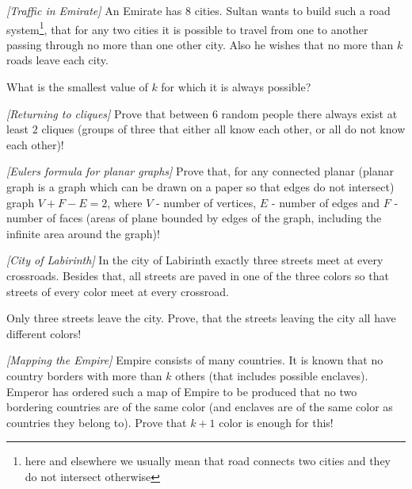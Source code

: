 

%



\noindent 


\begin{problem}
\textit{[Traffic in Emirate]}
An Emirate has 8 cities. Sultan wants to build such a road system\footnote{here and elsewhere we usually mean that road connects two cities and they do not intersect otherwise}, that for any two cities it is possible to travel from one to another passing through no more than one other city. Also he wishes that no more than $k$ roads leave each city.

 What is the smallest value of $k$ for which it is always possible?
\end{problem}
%

\begin{problem}
\textit{[Returning to cliques]}
Prove that between $6$ random people there always exist at least $2$ cliques (groups of three that either all know each other, or all do not know each other)!
\end{problem}
%

\begin{problem}
\textit{[Eulers formula for planar graphs]}
Prove that, for any connected planar (planar graph is a graph which can be drawn on a paper so that edges do not intersect) graph $V+F-E=2$, where $V$ - number of vertices, $E$ - number of edges and $F$ - number of faces (areas of plane bounded by edges of the graph, including the infinite area around the graph)!
\end{problem}





\begin{problem}
\textit{[City of Labirinth]}
In the city of Labirinth exactly three streets meet at every crossroads. Besides that, all streets are paved in one of the three colors so that streets of every color meet at every crossroad.
 
Only three streets leave the city. Prove, that the streets leaving the city all have different colors! 
\end{problem}
%

\begin{problem}
\textit{[Mapping the Empire]}
Empire consists of many countries. It is known that no country borders with more than $k$ others (that includes possible enclaves). Emperor has ordered such a map of Empire to be produced that no two bordering countries are of the same color (and enclaves are of the same color as countries they belong to). Prove that $k+1$ color is enough for this!
\end{problem}
%

